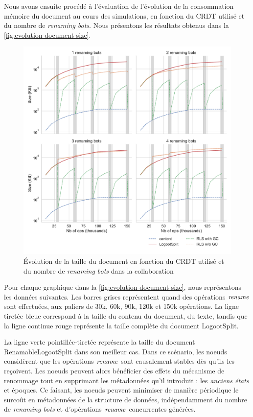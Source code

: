 
\label{sec:evaluation-metadata}

Nous avons ensuite procédé à l'évaluation de l'évolution de la consommation mémoire du document au cours des simulations, en fonction du \ac{CRDT} utilisé et du nombre de \emph{renaming bots}.
Nous présentons les résultats obtenus dans la \autoref{fig:evolution-document-size}.

\begin{figure}[!ht]
  \centering
  \includegraphics[width=\columnwidth]{img/2022-10-27-snapshot-sizes.pdf}
  \caption{Évolution de la taille du document en fonction du \ac{CRDT} utilisé et du nombre de \emph{renaming bots} dans la collaboration}
  \label{fig:evolution-document-size}
\end{figure}

Pour chaque graphique dans la \autoref{fig:evolution-document-size}, nous représentons les données suivantes.
Les barres grises représentent quand des opérations $\mathit{rename}$ sont effectuées, \ie aux paliers de 30k, 60k, 90k, 120k et 150k opérations.
La ligne tiretée bleue correspond à la taille du contenu du document, \ie du texte, tandis que la ligne continue rouge représente la taille complète du document LogootSplit.

La ligne verte pointillée-tiretée représente la taille du document RenamableLogootSplit dans son meilleur cas.
Dans ce scénario, les noeuds considèrent que les opérations $\mathit{rename}$ sont causalement stables dès qu'ils les reçoivent.
Les noeuds peuvent alors bénéficier des effets du mécanisme de renommage tout en supprimant les métadonnées qu'il introduit : les \emph{anciens états} et époques.
Ce faisant, les noeuds peuvent minimiser de manière périodique le surcoût en métadonnées de la structure de données, indépendamment du nombre de \emph{renaming bots} et d'opérations $\mathit{rename}$ concurrentes générées.

